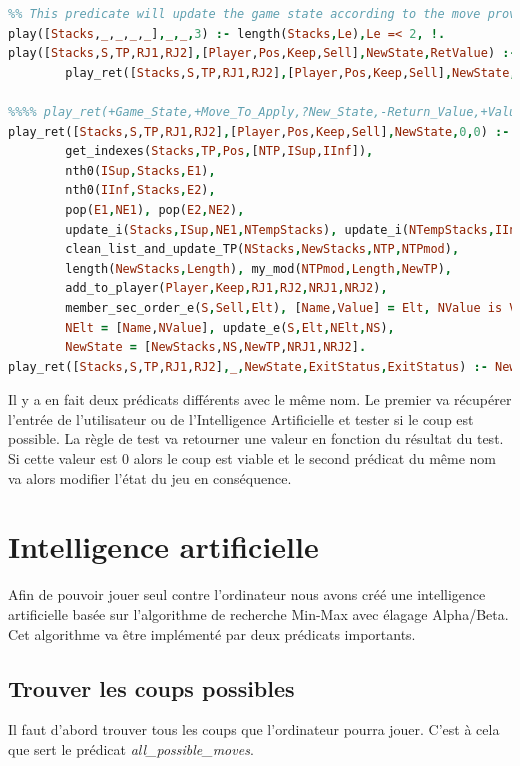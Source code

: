 \documentclass[a4paper, 11pt,twoside, leqno]{report}
\theoremstyle{plain}
\begin{document}
\begin{lstlisting}[language=prolog]
%%%% play(+Game_State,+Move_To_Apply,?New_State,-Return_Value)
%% This predicate will update the game state according to the move provided to the function.
play([Stacks,_,_,_,_],_,_,3) :- length(Stacks,Le),Le =< 2, !.
play([Stacks,S,TP,RJ1,RJ2],[Player,Pos,Keep,Sell],NewState,RetValue) :- length(Stacks,Le),Le > 2,is_possible(Stacks,TP,[Player,Pos,Keep,Sell],ExitStatus),
		play_ret([Stacks,S,TP,RJ1,RJ2],[Player,Pos,Keep,Sell],NewState,RetValue,ExitStatus).

%%%% play_ret(+Game_State,+Move_To_Apply,?New_State,-Return_Value,+Value_Returned_By_The_is_possible_Predicate)
play_ret([Stacks,S,TP,RJ1,RJ2],[Player,Pos,Keep,Sell],NewState,0,0) :- !,
		get_indexes(Stacks,TP,Pos,[NTP,ISup,IInf]),
		nth0(ISup,Stacks,E1),
		nth0(IInf,Stacks,E2),
		pop(E1,NE1), pop(E2,NE2),
		update_i(Stacks,ISup,NE1,NTempStacks), update_i(NTempStacks,IInf,NE2,NStacks),
		clean_list_and_update_TP(NStacks,NewStacks,NTP,NTPmod), 
		length(NewStacks,Length), my_mod(NTPmod,Length,NewTP), 
		add_to_player(Player,Keep,RJ1,RJ2,NRJ1,NRJ2),
		member_sec_order_e(S,Sell,Elt), [Name,Value] = Elt, NValue is Value - 1,
		NElt = [Name,NValue], update_e(S,Elt,NElt,NS), 
		NewState = [NewStacks,NS,NewTP,NRJ1,NRJ2].
play_ret([Stacks,S,TP,RJ1,RJ2],_,NewState,ExitStatus,ExitStatus) :- NewState =[Stacks,S,TP,RJ1,RJ2].
\end{lstlisting}

Il y a en fait deux prédicats différents avec le même nom. Le premier va récupérer l'entrée de l'utilisateur ou de l'Intelligence Artificielle et tester si le coup est possible. La règle de test va retourner une valeur en fonction du résultat du test. Si cette valeur est 0 alors le coup est viable et le second prédicat du même nom va alors modifier l'état du jeu en conséquence.

\section{Intelligence artificielle}

Afin de pouvoir jouer seul contre l'ordinateur nous avons créé une intelligence artificielle basée sur l'algorithme de recherche Min-Max avec élagage Alpha/Beta. Cet algorithme va être implémenté par deux prédicats importants.

\subsection{Trouver les coups possibles}
Il faut d'abord trouver tous les coups que l'ordinateur pourra jouer. C'est à cela que sert le prédicat \textit{all\_{}possible\_{}moves}.
\end{document}
